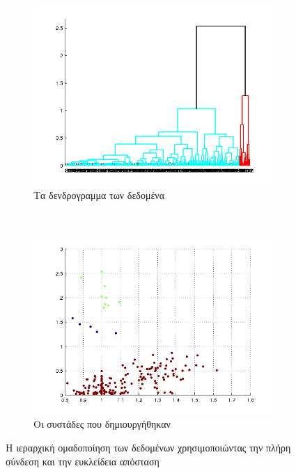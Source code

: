 \documentclass{assignment}
\begin{document}
\begin{figure}[htbp]
  \centering
  \begin{subfigure}[b]{0.5\textwidth}
     \includegraphics[width=\textwidth,height=0.25\textheight]{matlab/hierarchical_dendogram_complete_euclidean.png}
  \caption{Τα δενδρογραμμα των δεδομένα}
  \end{subfigure}%
   ~ %
  \begin{subfigure}[b]{0.5\textwidth}
    \includegraphics[width=\textwidth,height=0.25\textheight]{matlab/identified_clusters_complete_euclidean.png}
  \caption{Οι συστάδες που δημιουργήθηκαν}
  \end{subfigure}
  \caption{Η ιεραρχική ομαδοποίηση των δεδομένων χρησιμοποιώντας την πλήρη σύνδεση και την ευκλείδεια απόσταση}
\label{fig:clustering_complete_euclidean}
\end{figure}

\clearpage
{} \label{Βιβλιογραφία}



\newpage
\end{document}
